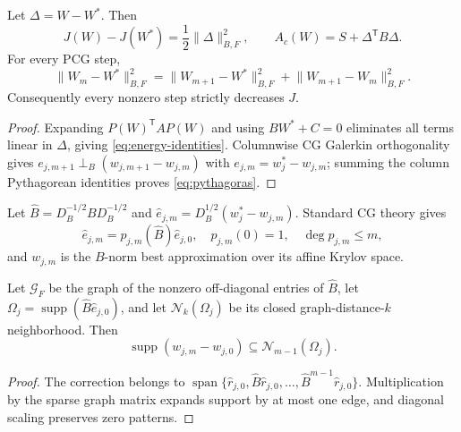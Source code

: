 \documentclass[smallextended]{svjour3}
\newcommand{\T}{\mathsf{T}}
\newcommand{\supp}{\operatorname{supp}}
\newcommand{\norm}[1]{\lVert#1\rVert}
\begin{document}
\begin{proposition}\label{prop:energy}
Let $\Delta=W-W^*$. Then
\begin{equation}\label{eq:energy-identities}
 J(W)-J(W^*)=\frac12\norm{\Delta}_{B,F}^2,
 \qquad A_c(W)=S+\Delta^{\T}B\Delta.
\end{equation}
For every PCG step,
\begin{equation}\label{eq:pythagoras}
 \norm{W_m-W^*}_{B,F}^2
 =\norm{W_{m+1}-W^*}_{B,F}^2
 +\norm{W_{m+1}-W_m}_{B,F}^2.
\end{equation}
Consequently every nonzero step strictly decreases $J$.
\end{proposition}
\begin{proof}
Expanding $P(W)^{\T} A P(W)$ and using $BW^*+C=0$ eliminates all terms linear in $\Delta$, giving \eqref{eq:energy-identities}. Columnwise CG Galerkin orthogonality gives
$e_{j,m+1}\perp_B(w_{j,m+1}-w_{j,m})$ with
$e_{j,m}=w_j^*-w_{j,m}$; summing the column Pythagorean identities proves \eqref{eq:pythagoras}.
\end{proof}

Let $\widehat B=D_B^{-1/2}BD_B^{-1/2}$ and
$\widehat e_{j,m}=D_B^{1/2}(w_j^*-w_{j,m})$. Standard CG theory \cite{hestenes1952cg,saad2003iterative} gives
\begin{equation}\label{eq:krylov-poly}
 \widehat e_{j,m}=p_{j,m}(\widehat B)\widehat e_{j,0},
 \quad p_{j,m}(0)=1,
 \quad \deg p_{j,m}\le m,
\end{equation}
and $w_{j,m}$ is the $B$-norm best approximation over its affine Krylov space.

\begin{proposition}\label{prop:propagation}
Let $\mathcal G_F$ be the graph of the nonzero off-diagonal entries of $\widehat B$, let
$\Omega_j=\supp(\widehat B\widehat e_{j,0})$, and let $\mathcal N_k(\Omega_j)$ be its closed graph-distance-$k$ neighborhood. Then
\begin{equation}\label{eq:finite-propagation}
 \supp(w_{j,m}-w_{j,0})\subseteq\mathcal N_{m-1}(\Omega_j).
\end{equation}
\end{proposition}
\begin{proof}
The correction belongs to
$\operatorname{span}\{\widehat r_{j,0},\widehat B\widehat r_{j,0},\ldots,
\widehat B^{m-1}\widehat r_{j,0}\}$. Multiplication by the sparse graph matrix expands support by at most one edge, and diagonal scaling preserves zero patterns.
\end{proof}
\end{document}
